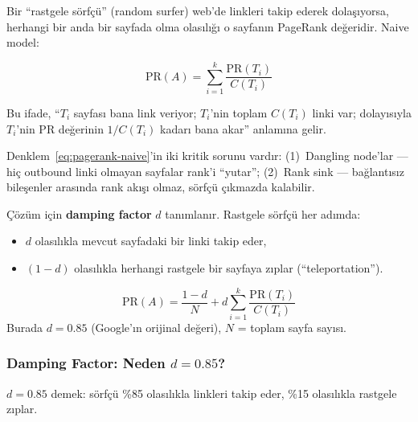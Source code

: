 \noindent
Bir ``rastgele s\"{o}rf\c{c}\"{u}'' (random surfer) web'de linkleri takip ederek dola\c{s}{\i}yorsa, herhangi bir anda bir sayfada olma olas{\i}l{\i}\u{g}{\i} o sayfan{\i}n PageRank de\u{g}eridir. Naive model:

\begin{equation}
\text{PR}(A) = \sum_{i=1}^{k} \frac{\text{PR}(T_i)}{C(T_i)}
\label{eq:pagerank-naive}
\end{equation}

\noindent
Bu ifade, ``$T_i$ sayfas{\i} bana link veriyor; $T_i$'nin toplam $C(T_i)$ linki var; dolay{\i}s{\i}yla $T_i$'nin PR de\u{g}erinin $1/C(T_i)$ kadar{\i} bana akar'' anlam{\i}na gelir.

\begin{dikkat}
Denklem~\eqref{eq:pagerank-naive}'in iki kritik sorunu vard{\i}r: (1)~Dangling node'lar --- hi\c{c} outbound linki olmayan sayfalar rank'i ``yutar''; (2)~Rank sink --- ba\u{g}lant{\i}s{\i}z bile\c{s}enler aras{\i}nda rank ak{\i}\c{s}{\i} olmaz, s\"{o}rf\c{c}\"{u} \c{c}{\i}kmazda kalabilir.
\end{dikkat}

\noindent
\c{C}\"{o}z\"{u}m i\c{c}in \textbf{damping factor} $d$ tan{\i}mlan{\i}r. Rastgele s\"{o}rf\c{c}\"{u} her ad{\i}mda:
\begin{itemize}
  \item $d$ olas{\i}l{\i}kla mevcut sayfadaki bir linki takip eder,
  \item $(1-d)$ olas{\i}l{\i}kla herhangi rastgele bir sayfaya z{\i}plar (``teleportation'').
\end{itemize}

\begin{formulbox}
\begin{equation}
\text{PR}(A) = \frac{1-d}{N} + d \sum_{i=1}^{k} \frac{\text{PR}(T_i)}{C(T_i)}
\label{eq:pagerank}
\end{equation}
Burada $d = 0.85$ (Google'{\i}n orijinal de\u{g}eri), $N$ = toplam sayfa say{\i}s{\i}.
\end{formulbox}

\subsubsection{Damping Factor: Neden $d = 0.85$?}

$d = 0.85$ demek: s\"{o}rf\c{c}\"{u} \%85 olas{\i}l{\i}kla linkleri takip eder, \%15 olas{\i}l{\i}kla rastgele z{\i}plar.

